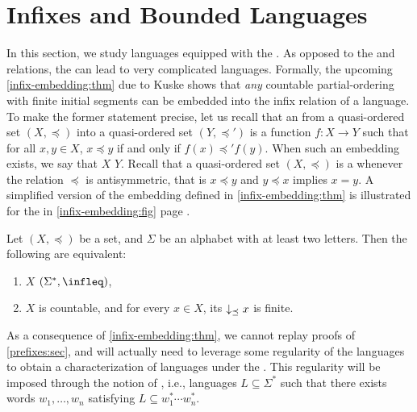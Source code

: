 \section{Infixes and Bounded Languages}
\label{infixes-bounded:sec}

\AP In this section, we study languages equipped with the .
As opposed to the  and  relations, the  can lead to very complicated  languages.
Formally, the upcoming \cref{infix-embedding:thm} due to Kuske shows that
\emph{any} countable partial-ordering with finite initial segments can be
embedded into the infix relation of a language. To make the former statement
precise, let us recall that an  from a quasi-ordered set
$(X, \preceq)$ into a quasi-ordered set $(Y, \preceq')$ is a function $f \colon
X \to Y$ such that for all $x, y \in X$, $x \preceq y$ if and only if $f(x)
\preceq' f(y)$. When such an embedding exists, we say that $X$  $Y$. Recall that a quasi-ordered set $(X, \preceq)$ is a  whenever the relation $\preceq$ is antisymmetric, that is $x \preceq
y$ and $y \preceq x$ implies $x = y$. 
A simplified version of the embedding defined in \cref{infix-embedding:thm} is illustrated
for the  in \cref{infix-embedding:fig} page \pageref{infix-embedding:fig}.
\begin{lemma}{\cite[Lemma 5.1]{DBLP:journals/ita/Kuske06}}
    \label{infix-embedding:thm}
    Let $(X, \preceq)$ be a  set,
    and $\Sigma$ be an alphabet with at least two letters.
    Then the following are equivalent:
    \begin{enumerate}
        \item 
            $X$  $(\Sigma^*, \infleq)$,
        \item 
            $X$ is countable, and for every $x \in X$,
            its 
            $\dwset[\preceq]{x}$ is finite.
    \end{enumerate}
\end{lemma}

\AP As a consequence of \cref{infix-embedding:thm}, we cannot replay
proofs of \cref{prefixes:sec}, and will
actually need to leverage some regularity of the languages to obtain a
characterization of  languages under the . This regularity will be imposed through the notion of , i.e., languages $L \subseteq \Sigma^*$ such that there exists words
$w_1, \dots, w_n$ satisfying $L \subseteq w_1^* \cdots w_n^*$.

